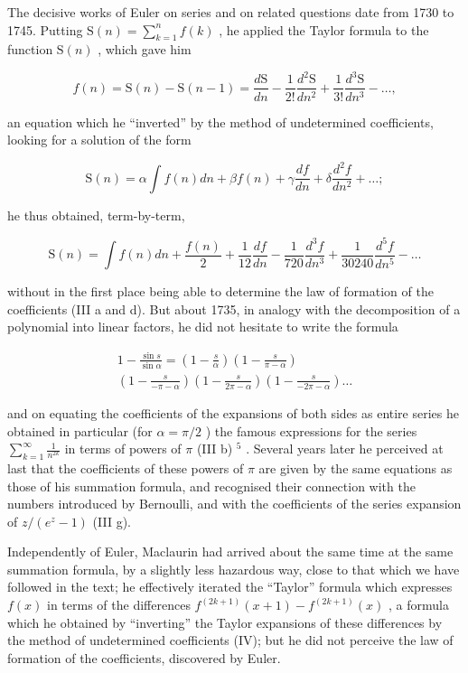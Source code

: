 The decisive works of Euler on series and on related questions date from 1730 to 1745. Putting \(\mathrm{S}(n) = \sum_{k=1}^{n} f(k)\) , he applied the Taylor formula to the function \(\mathrm{S}(n)\) , which gave him

\[
f (n) = \mathrm{S} (n) - \mathrm{S} (n - 1) = \frac {d \mathrm{S}}{d n} - \frac {1}{2 !} \frac {d ^ {2} \mathrm{S}}{d n ^ {2}} + \frac {1}{3 !} \frac {d ^ {3} \mathrm{S}}{d n ^ {3}} - \dots ,
\]

an equation which he ``inverted'' by the method of undetermined coefficients, looking for a solution of the form

\[
\mathrm{S} (n) = \alpha \int f (n) d n + \beta f (n) + \gamma \frac {d f}{d n} + \delta \frac {d ^ {2} f}{d n ^ {2}} + \dots ;
\]

he thus obtained, term-by-term,

\[
\mathrm{S} (n) = \int f (n) d n + \frac {f (n)}{2} + \frac {1}{1 2} \frac {d f}{d n} - \frac {1}{7 2 0} \frac {d ^ {3} f}{d n ^ {3}} + \frac {1}{3 0 2 4 0} \frac {d ^ {5} f}{d n ^ {5}} - \dots
\]

without in the first place being able to determine the law of formation of the coefficients (III a and d). But about 1735, in analogy with the decomposition of a polynomial into linear factors, he did not hesitate to write the formula

\[
\begin{array}{c} 1 - \frac {\sin s}{\sin \alpha} = \left(1 - \frac {s}{\alpha}\right) \left(1 - \frac {s}{\pi - \alpha}\right) \\ \left(1 - \frac {s}{- \pi - \alpha}\right) \left(1 - \frac {s}{2 \pi - \alpha}\right) \left(1 - \frac {s}{- 2 \pi - \alpha}\right) \dots \end{array}
\]

and on equating the coefficients of the expansions of both sides as entire series he obtained in particular (for \(\alpha = \pi/2\) ) the famous expressions for the series \(\sum_{k=1}^{\infty} \frac{1}{n^{2k}}\) in terms of powers of \(\pi\) (III b) \(^{5}\) . Several years later he perceived at last that the coefficients of these powers of \(\pi\) are given by the same equations as those of his summation formula, and recognised their connection with the numbers introduced by Bernoulli, and with the coefficients of the series expansion of \(z/(e^{z} - 1)\) (III g).

Independently of Euler, Maclaurin had arrived about the same time at the same summation formula, by a slightly less hazardous way, close to that which we have followed in the text; he effectively iterated the ``Taylor'' formula which expresses \(f(x)\) in terms of the differences \(f^{(2k+1)}(x+1)-f^{(2k+1)}(x)\) , a formula which he obtained by ``inverting'' the Taylor expansions of these differences by the method of undetermined coefficients (IV); but he did not perceive the law of formation of the coefficients, discovered by Euler.

